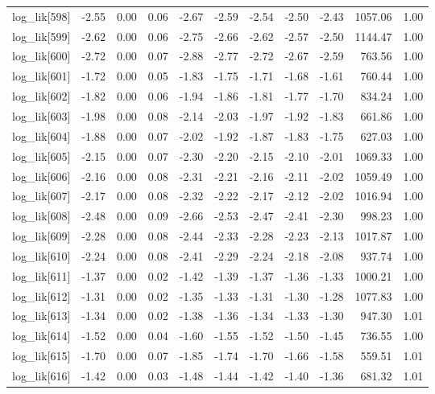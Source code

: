 \begin{table}[ht]
\begin{tabular}{rrrrrrrrrrr}
  log\_lik[598] & -2.55 & 0.00 & 0.06 & -2.67 & -2.59 & -2.54 & -2.50 & -2.43 & 1057.06 & 1.00 \\ 
  log\_lik[599] & -2.62 & 0.00 & 0.06 & -2.75 & -2.66 & -2.62 & -2.57 & -2.50 & 1144.47 & 1.00 \\ 
  log\_lik[600] & -2.72 & 0.00 & 0.07 & -2.88 & -2.77 & -2.72 & -2.67 & -2.59 & 763.56 & 1.00 \\ 
  log\_lik[601] & -1.72 & 0.00 & 0.05 & -1.83 & -1.75 & -1.71 & -1.68 & -1.61 & 760.44 & 1.00 \\ 
  log\_lik[602] & -1.82 & 0.00 & 0.06 & -1.94 & -1.86 & -1.81 & -1.77 & -1.70 & 834.24 & 1.00 \\ 
  log\_lik[603] & -1.98 & 0.00 & 0.08 & -2.14 & -2.03 & -1.97 & -1.92 & -1.83 & 661.86 & 1.00 \\ 
  log\_lik[604] & -1.88 & 0.00 & 0.07 & -2.02 & -1.92 & -1.87 & -1.83 & -1.75 & 627.03 & 1.00 \\ 
  log\_lik[605] & -2.15 & 0.00 & 0.07 & -2.30 & -2.20 & -2.15 & -2.10 & -2.01 & 1069.33 & 1.00 \\ 
  log\_lik[606] & -2.16 & 0.00 & 0.08 & -2.31 & -2.21 & -2.16 & -2.11 & -2.02 & 1059.49 & 1.00 \\ 
  log\_lik[607] & -2.17 & 0.00 & 0.08 & -2.32 & -2.22 & -2.17 & -2.12 & -2.02 & 1016.94 & 1.00 \\ 
  log\_lik[608] & -2.48 & 0.00 & 0.09 & -2.66 & -2.53 & -2.47 & -2.41 & -2.30 & 998.23 & 1.00 \\ 
  log\_lik[609] & -2.28 & 0.00 & 0.08 & -2.44 & -2.33 & -2.28 & -2.23 & -2.13 & 1017.87 & 1.00 \\ 
  log\_lik[610] & -2.24 & 0.00 & 0.08 & -2.41 & -2.29 & -2.24 & -2.18 & -2.08 & 937.74 & 1.00 \\ 
  log\_lik[611] & -1.37 & 0.00 & 0.02 & -1.42 & -1.39 & -1.37 & -1.36 & -1.33 & 1000.21 & 1.00 \\ 
  log\_lik[612] & -1.31 & 0.00 & 0.02 & -1.35 & -1.33 & -1.31 & -1.30 & -1.28 & 1077.83 & 1.00 \\ 
  log\_lik[613] & -1.34 & 0.00 & 0.02 & -1.38 & -1.36 & -1.34 & -1.33 & -1.30 & 947.30 & 1.01 \\ 
  log\_lik[614] & -1.52 & 0.00 & 0.04 & -1.60 & -1.55 & -1.52 & -1.50 & -1.45 & 736.55 & 1.00 \\ 
  log\_lik[615] & -1.70 & 0.00 & 0.07 & -1.85 & -1.74 & -1.70 & -1.66 & -1.58 & 559.51 & 1.01 \\ 
  log\_lik[616] & -1.42 & 0.00 & 0.03 & -1.48 & -1.44 & -1.42 & -1.40 & -1.36 & 681.32 & 1.01 \\ 

\end{tabular}
\end{table}
